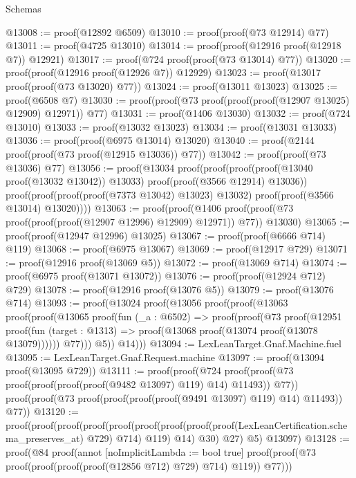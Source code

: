 \begin{lexlean}{Schemas}
\begin{coremodule}
@13008 := proof(@12892 @6509)
@13010 := proof(proof(@73 @12914) @77)
@13011 := proof(@4725 @13010)
@13014 := proof(proof(@12916 proof(@12918 @7)) @12921)
@13017 := proof(@724 proof(proof(@73 @13014) @77))
@13020 := proof(proof(@12916 proof(@12926 @7)) @12929)
@13023 := proof(@13017 proof(proof(@73 @13020) @77))
@13024 := proof(@13011 @13023)
@13025 := proof(@6508 @7)
@13030 := proof(proof(@73 proof(proof(proof(@12907 @13025) @12909) @12971)) @77)
@13031 := proof(@1406 @13030)
@13032 := proof(@724 @13010)
@13033 := proof(@13032 @13023)
@13034 := proof(@13031 @13033)
@13036 := proof(proof(@6975 @13014) @13020)
@13040 := proof(@2144 proof(proof(@73 proof(@12915 @13036)) @77))
@13042 := proof(proof(@73 @13036) @77)
@13056 := proof(@13034
      proof(proof(proof(proof(@13040 proof(@13032 @13042)) @13033)
            proof(proof(@3566 @12914) @13036))
          proof(proof(proof(proof(@7373 @13042) @13023) @13032) proof(proof(@3566 @13014) @13020))))
@13063 := proof(proof(@1406 proof(proof(@73 proof(proof(proof(@12907 @12996) @12909) @12971)) @77))
      @13030)
@13065 := proof(proof(@12947 @12996) @13025)
@13067 := proof(proof(@6666 @714) @119)
@13068 := proof(@6975 @13067)
@13069 := proof(@12917 @729)
@13071 := proof(@12916 proof(@13069 @5))
@13072 := proof(@13069 @714)
@13074 := proof(@6975 proof(@13071 @13072))
@13076 := proof(proof(@12924 @712) @729)
@13078 := proof(@12916 proof(@13076 @5))
@13079 := proof(@13076 @714)
@13093 := proof(@13024
      proof(@13056
          proof(proof(@13063
                proof(proof(@13065
                      proof(fun (_a : @6502) =>
                        proof(proof(@73
                              proof(@12951
                                  proof(fun (target : @1313) =>
                                    proof(@13068 proof(@13074 proof(@13078 @13079))))))
                            @77)))
                    @5))
              @14)))
@13094 := LexLeanTarget.Gnaf.Machine.fuel
@13095 := LexLeanTarget.Gnaf.Request.machine
@13097 := proof(@13094 proof(@13095 @729))
@13111 := proof(proof(@724
        proof(proof(@73 proof(proof(proof(proof(@9482 @13097) @119) @14) @11493)) @77))
      proof(proof(@73 proof(proof(proof(proof(@9491 @13097) @119) @14) @11493)) @77))
@13120 := proof(proof(proof(proof(proof(proof(proof(proof(proof(LexLeanCertification.schema_preserves_at)
                    @729)
                  @714)
                @119)
              @14)
            @30)
          @27)
        @5)
      @13097)
@13128 := proof(@84
      proof(annot [noImplicitLambda := bool true]
        proof(proof(@73 proof(proof(proof(proof(@12856 @712) @729) @714) @119)) @77)))

\end{coremodule}
\end{lexlean}
